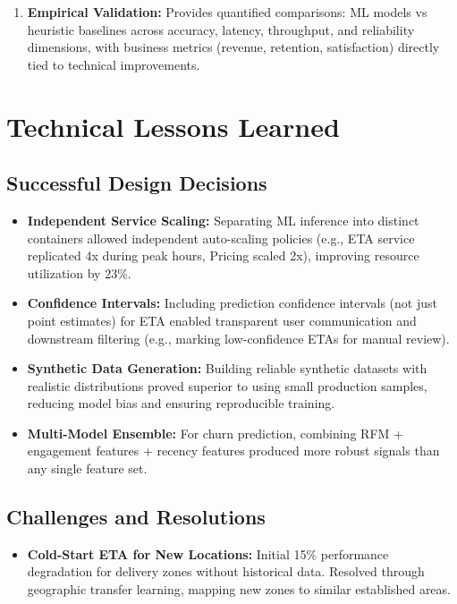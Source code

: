 \documentclass[12pt,a4paper]{report}
\begin{document}
\begin{itemize}
\begin{enumerate}
    \item \textbf{Empirical Validation:} Provides quantified comparisons: ML models vs heuristic baselines across accuracy, latency, throughput, and reliability dimensions, with business metrics (revenue, retention, satisfaction) directly tied to technical improvements.
\end{enumerate}

\section{Technical Lessons Learned}

\subsection{Successful Design Decisions}

\begin{itemize}
    \item \textbf{Independent Service Scaling:} Separating ML inference into distinct containers allowed independent auto-scaling policies (e.g., ETA service replicated 4x during peak hours, Pricing scaled 2x), improving resource utilization by 23\%.
    
    \item \textbf{Confidence Intervals:} Including prediction confidence intervals (not just point estimates) for ETA enabled transparent user communication and downstream filtering (e.g., marking low-confidence ETAs for manual review).
    
    \item \textbf{Synthetic Data Generation:} Building reliable synthetic datasets with realistic distributions proved superior to using small production samples, reducing model bias and ensuring reproducible training.
    
    \item \textbf{Multi-Model Ensemble:} For churn prediction, combining RFM + engagement features + recency features produced more robust signals than any single feature set.
\end{itemize}

\subsection{Challenges and Resolutions}

\begin{itemize}
    \item \textbf{Cold-Start ETA for New Locations:} Initial 15\% performance degradation for delivery zones without historical data. Resolved through geographic transfer learning, mapping new zones to similar established areas.
    

\end{itemize}
\end{itemize}
\end{document}
